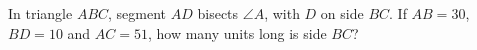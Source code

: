 In triangle $ABC$, segment $AD$ bisects $\angle A$, with $D$ on side $BC$. If $AB=30$, $BD=10$ and $AC=51$, how many units long is side $BC$?
